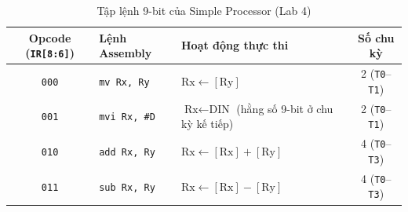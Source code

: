 \documentclass[11pt,a4paper]{article}
\newcommand{\code}[1]{\texttt{\small #1}}
\begin{document}
\begin{table}[H]
  \centering
  \caption{Tập lệnh 9-bit của Simple Processor (Lab 4)}
  \label{tab:lab4_isa}
  \small
  \renewcommand{\arraystretch}{1.12}
  \begin{tabular}{@{}c l l c@{}}
    \toprule
    \textbf{Opcode (\code{IR[8:6]})} & \textbf{Lệnh Assembly} & \textbf{Hoạt động thực thi} & \textbf{Số chu kỳ} \\
    \midrule
    \code{000} & \code{mv Rx, Ry}  & $\text{Rx} \leftarrow [\text{Ry}]$ & 2 (\code{T0}--\code{T1}) \\
    \code{001} & \code{mvi Rx, \#D} & $\text{Rx} \leftarrow \text{DIN}$ (hằng số 9-bit ở chu kỳ kế tiếp) & 2 (\code{T0}--\code{T1}) \\
    \code{010} & \code{add Rx, Ry} & $\text{Rx} \leftarrow [\text{Rx}] + [\text{Ry}]$ & 4 (\code{T0}--\code{T3}) \\
    \code{011} & \code{sub Rx, Ry} & $\text{Rx} \leftarrow [\text{Rx}] - [\text{Ry}]$ & 4 (\code{T0}--\code{T3}) \\
    \bottomrule
  \end{tabular}
\end{table}
\end{document}
